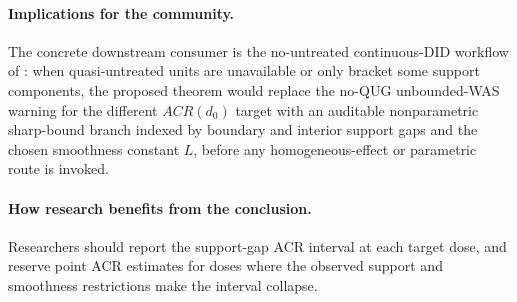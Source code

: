\documentclass[11pt]{article}
\theoremstyle{definition}
\theoremstyle{plain}
\theoremstyle{remark}
\begin{document}
\paragraph{Implications for the community.}
The concrete downstream consumer is the no-untreated continuous-DID workflow of \citet{DCDHK2026NoUntreated}: when quasi-untreated units are unavailable or only bracket some support components, the proposed theorem would replace the no-QUG unbounded-WAS warning for the different \(ACR(d_0)\) target with an auditable nonparametric sharp-bound branch indexed by boundary and interior support gaps and the chosen smoothness constant \(L\), before any homogeneous-effect or parametric route is invoked.

\paragraph{How research benefits from the conclusion.}
Researchers should report the support-gap ACR interval at each target dose, and reserve point ACR estimates for doses where the observed support and smoothness restrictions make the interval collapse.
\end{document}
